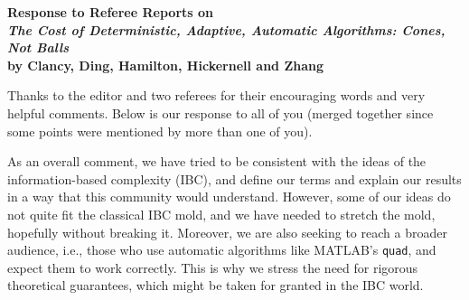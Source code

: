 \documentclass[11pt]{article}
\begin{document}
\begin{center}
{\bf Response to Referee Reports on \\[3ex]
{\Large \emph{The Cost of Deterministic, Adaptive, Automatic Algorithms:  Cones, Not Balls} \\[2ex] by Clancy, Ding, Hamilton, Hickernell and Zhang}}
\end{center}

\bigskip

Thanks to the editor and two referees for their encouraging words and very helpful comments.  Below is our response to all of you (merged together since some points were mentioned by more than one of you).  

As an overall comment, we have tried to be consistent with the ideas of the information-based complexity (IBC), and define our terms and explain our results in a way that this community would understand.  However, some of our ideas do not quite fit the classical IBC mold, and we have needed to stretch the mold, hopefully without breaking it.  Moreover, we are also seeking to reach a broader audience, i.e., those who use automatic algorithms like MATLAB's {\tt quad}, and expect them to work correctly.  This is why we stress the need for rigorous theoretical guarantees, which might be taken for granted in the IBC world.
\end{document}
